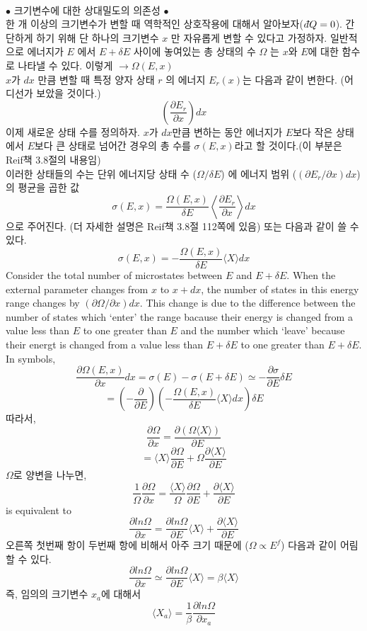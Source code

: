 \documentclass[a4paper,12pt]{article}
\newcommand{\dbar}{d\hspace*{-0.08em}\bar{}\hspace*{0.1em}}
\begin{document}
\paragraph{}
$\bullet$ 크기변수에 대한 상대밀도의 의존성 $\bullet$\\
한 개 이상의 크기변수가 변할 때 역학적인 상호작용에 대해서 알아보자($\dbar Q=0$). 간단하게 하기 위해 단 하나의 크기변수 $x$ 만 자유롭게 변할 수 있다고 가정하자. 일반적으로 에너지가 $E$ 에서 $E+\delta E$ 사이에 놓여있는 총 상태의 수 $\Omega$ 는 $x$와 $E$에 대한 함수로 나타낼 수 있다. 이렇게 $\longrightarrow \Omega(E,x)$\\
$x$가 $dx$ 만큼 변할 때 특정 양자 상태 $r$ 의 에너지 $E_r(x)$는 다음과 같이 변한다. (어디선가 보았을 것이다.) $$\left( \frac{\partial E_r}{\partial x} \right)dx $$
이제 새로운 상태 수를 정의하자. $x$가 $dx$만큼 변하는 동안 에너지가 $E$보다 작은 상태에서 $E$보다 큰 상태로 넘어간 경우의 총 수를 $\sigma(E,x)$라고 할 것이다.(이 부분은 Reif책 3.8절의 내용임) \\
 이러한 상태들의 수는 단위 에너지당 상태 수 ($\Omega/\delta E$) 에 에너지 범위 ($(\partial E_r/\partial x)dx$) 의 평균을 곱한 값
 $$\sigma(E,x)=\frac{\Omega(E,x)}{\delta E}\left\langle  \frac{\partial E_r}{\partial x}\right\rangle  dx$$ 으로 주어진다. (더 자세한 설명은 Reif책 3.8절 112쪽에 있음) 또는 다음과 같이 쓸 수 있다.
 $$\sigma(E,x)=-\frac{\Omega(E,x)}{\delta E}\langle X \rangle dx$$
 Consider the total number of microstates between $E$ and $E+\delta E$. When the external parameter changes from $x$ to $x+dx$, the number of states in this energy range changes by $(\partial\Omega/\partial x)dx$. This change is due to the difference between the number of states which `enter' the range bacause their energy is changed from a value less than $E$ to one greater than $E$ and the number which `leave' because their energt is changed from a value less than $E+\delta E$ to one greater than $E+\delta E$. In symbols,
 $$\frac{\partial \Omega(E,x)}{\partial x}dx=\sigma(E)-\sigma(E+\delta E)\simeq-\frac{\partial \sigma}{\partial E}\delta E$$
 $$=(-\frac{\partial}{\partial E})(-\frac{\Omega(E,x)}{\delta E} \langle X \rangle dx)\delta E$$
 따라서, 
 $$\frac{\partial \Omega}{\partial x}=\frac{\partial(\Omega \langle X \rangle )}{\partial E}$$
 $$=\langle X \rangle\frac{\partial \Omega}{\partial E}+\Omega\frac{\partial \langle X \rangle}{\partial E}$$
 $\Omega$로 양변을 나누면,
 $$\frac{1}{\Omega}\frac{\partial \Omega}{\partial x}=\frac{\langle X\rangle}{\Omega}\frac{\partial \Omega}{\partial E}+\frac{\partial \langle X\rangle}{\partial E}$$ is equivalent to 
$$\frac{\partial ln\Omega}{\partial x}=\frac{\partial ln \Omega}{\partial E}\langle X\rangle+\frac{\partial \langle X\rangle}{\partial E}$$ 오른쪽 첫번째 항이 두번째 항에 비해서 아주 크기 때문에 ($\Omega \propto E^f$) 다음과 같이 어림할 수 있다. 
$$\frac{\partial ln\Omega}{\partial x}\simeq\frac{\partial ln \Omega}{\partial E}\langle X\rangle=\beta\langle X\rangle$$ 
즉, 임의의 크기변수 $x_a$에 대해서 
$$\langle X_a \rangle=\frac{1}{\beta}\frac{\partial ln \Omega}{\partial x_a}$$
\end{document}
